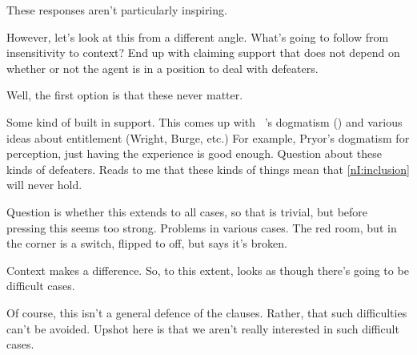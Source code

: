 \begin{note}[Uninspiring]
  These responses aren't particularly inspiring.

  However, let's look at this from a different angle.
  What's going to follow from insensitivity to context?
  End up with claiming support that does not depend on whether or not the agent is in a position to deal with defeaters.

  Well, the first option is that these never matter.

  Some kind of built in support.
  This comes up with ~\citeauthor{Pryor:2012tq}'s dogmatism (\cite{Pryor:2000tl,Pryor:2012tq}) and various ideas about entitlement (Wright, Burge, etc.)
  For example, Pryor's dogmatism for perception, just having the experience is good enough.
  Question about these kinds of defeaters.
  Reads to me that these kinds of things mean that \ref{nI:inclusion} will never hold.

  Question is whether this extends to all cases, so that \nI{} is trivial, but before pressing this seems too strong.
  Problems in various cases.
  The red room, but in the corner is a switch, flipped to off, but says it's broken.

  Context makes a difference.
  So, to this extent, looks as though there's going to be difficult cases.
\end{note}

\begin{note}
  Of course, this isn't a general defence of the clauses.
  Rather, that such difficulties can't be avoided.
  Upshot here is that we aren't really interested in such difficult cases.
\end{note}

